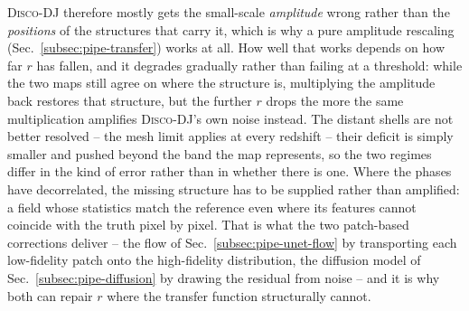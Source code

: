 \documentclass{report}
\begin{document}
\textsc{Disco-DJ} therefore mostly gets the small-scale \emph{amplitude} wrong rather than the \emph{positions} of the structures that carry it, which is why a pure amplitude rescaling (Sec.~\ref{subsec:pipe-transfer}) works at all. How well that works depends on how far \mbox{$r$} has fallen, and it degrades gradually rather than failing at a threshold: while the two maps still agree on where the structure is, multiplying the amplitude back restores that structure, but the further \mbox{$r$} drops the more the same multiplication amplifies \textsc{Disco-DJ}'s own noise instead.
The distant shells are not better resolved -- the mesh limit applies at every redshift -- their deficit is simply smaller and pushed beyond the band the map represents, so the two regimes differ in the kind of error rather than in whether there is one. Where the phases have decorrelated, the missing structure has to be supplied rather than amplified: a field whose statistics match the reference even where its features cannot coincide with the truth pixel by pixel. That is what the two patch-based corrections deliver -- the flow of Sec.~\ref{subsec:pipe-unet-flow} by transporting each low-fidelity patch onto the high-fidelity distribution, the diffusion model of Sec.~\ref{subsec:pipe-diffusion} by drawing the residual from noise -- and it is why both can repair \mbox{$r$} where the transfer function structurally cannot.
\end{document}
